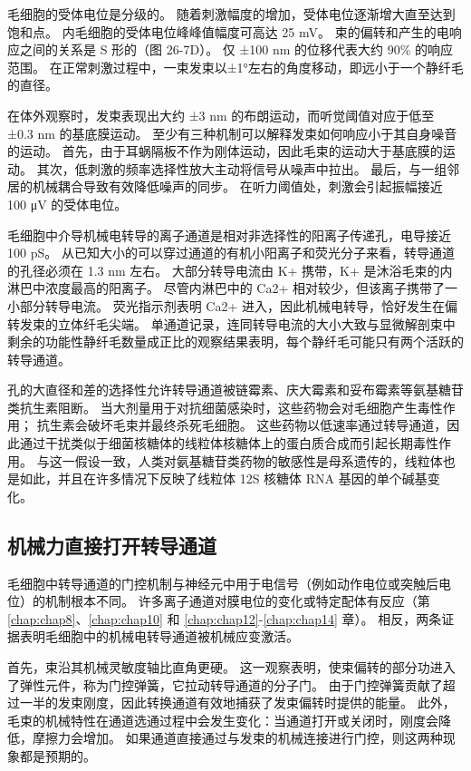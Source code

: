 毛细胞的受体电位是分级的。 
随着刺激幅度的增加，受体电位逐渐增大直至达到饱和点。 
内毛细胞的受体电位峰峰值幅度可高达 25 mV。 
束的偏转和产生的电响应之间的关系是 S 形的（图 26-7D）。 
仅 ±100 nm 的位移代表大约 90\% 的响应范围。 
在正常刺激过程中，一束发束以±1°左右的角度移动，即远小于一个静纤毛的直径。


在体外观察时，发束表现出大约 ±3 nm 的布朗运动，而听觉阈值对应于低至 ±0.3 nm 的基底膜运动。 
至少有三种机制可以解释发束如何响应小于其自身噪音的运动。 
首先，由于耳蜗隔板不作为刚体运动，因此毛束的运动大于基底膜的运动。 
其次，低刺激的频率选择性放大主动将信号从噪声中拉出。 
最后，与一组邻居的机械耦合导致有效降低噪声的同步。 
在听力阈值处，刺激会引起振幅接近 100 μV 的受体电位。


毛细胞中介导机械电转导的离子通道是相对非选择性的阳离子传递孔，电导接近 100 pS。 
从已知大小的可以穿过通道的有机小阳离子和荧光分子来看，转导通道的孔径必须在 1.3 nm 左右。 
大部分转导电流由 K+ 携带，K+ 是沐浴毛束的内淋巴中浓度最高的阳离子。 
尽管内淋巴中的 Ca2+ 相对较少，但该离子携带了一小部分转导电流。 
荧光指示剂表明 Ca2+ 进入，因此机械电转导，恰好发生在偏转发束的立体纤毛尖端。 
单通道记录，连同转导电流的大小大致与显微解剖束中剩余的功能性静纤毛数量成正比的观察结果表明，每个静纤毛可能只有两个活跃的转导通道。


孔的大直径和差的选择性允许转导通道被链霉素、庆大霉素和妥布霉素等氨基糖苷类抗生素阻断。 
当大剂量用于对抗细菌感染时，这些药物会对毛细胞产生毒性作用； 抗生素会破坏毛束并最终杀死毛细胞。 
这些药物以低速率通过转导通道，因此通过干扰类似于细菌核糖体的线粒体核糖体上的蛋白质合成而引起长期毒性作用。 
与这一假设一致，人类对氨基糖苷类药物的敏感性是母系遗传的，线粒体也是如此，并且在许多情况下反映了线粒体 12S 核糖体 RNA 基因的单个碱基变化。


\subsection{机械力直接打开转导通道}
毛细胞中转导通道的门控机制与神经元中用于电信号（例如动作电位或突触后电位）的机制根本不同。 
许多离子通道对膜电位的变化或特定配体有反应（第 \ref{chap:chap8}、\ref{chap:chap10} 和 \ref{chap:chap12}-\ref{chap:chap14} 章）。 
相反，两条证据表明毛细胞中的机械电转导通道被机械应变激活。


首先，束沿其机械灵敏度轴比直角更硬。 
这一观察表明，使束偏转的部分功进入了弹性元件，称为门控弹簧，它拉动转导通道的分子门。 
由于门控弹簧贡献了超过一半的发束刚度，因此转换通道有效地捕获了发束偏转时提供的能量。 
此外，毛束的机械特性在通道选通过程中会发生变化：当通道打开或关闭时，刚度会降低，摩擦力会增加。 
如果通道直接通过与发束的机械连接进行门控，则这两种现象都是预期的。


